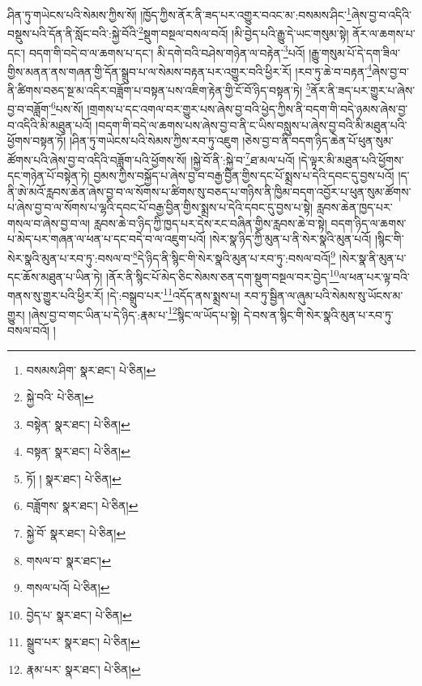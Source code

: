 ཤིན་ཏུ་གཡེངས་པའི་སེམས་ཀྱིས་སོ། །ཁྱོད་ཀྱིས་ནོར་ནི་ཟད་པར་འགྱུར་བའང་མ་:བསམས་ཤིང་\footnote{བསམས་ཤིག་  སྣར་ཐང་།  པེ་ཅིན། }ཞེས་བྱ་བ་འདིའི་བསྡུས་པའི་དོན་ནི་སློང་བའི་:སྐྱེ་བོའི་\footnote{སྐྱེ་བའི་  པེ་ཅིན། }སྡུག་བསྔལ་བསལ་བའོ། །མི་བྱེད་པའི་རྒྱུ་དེ་ཡང་གསུམ་སྟེ། ནོར་ལ་ཆགས་པ་དང་། བདག་གི་བདེ་བ་ལ་ཆགས་པ་དང་། མི་དགེ་བའི་བཤེས་གཉེན་ལ་བརྟེན་\footnote{བསྟེན་  སྣར་ཐང་།  པེ་ཅིན། }པའོ། །རྒྱུ་གསུམ་པོ་དེ་དག་ཟིལ་གྱིས་མནན་ནས་གཞན་གྱི་དོན་སྒྲུབ་པ་ལ་སེམས་བརྟན་པར་འགྱུར་བའི་ཕྱིར་རོ། །རབ་ཏུ་ཆེ་བ་བརྟན་\footnote{བསྟན་  སྣར་ཐང་།  པེ་ཅིན། }ཞེས་བྱ་བ་ནི་ཚིགས་བཅད་སྔ་མ་འདིར་བཟློག་པ་བསྟན་པས་འཇིག་རྟེན་གྱི་ངོ་བོ་ཉིད་བསྟན་ཏེ། \footnote{ཏོ། །   སྣར་ཐང་།  པེ་ཅིན། }ནོར་ནི་ཟད་པར་གྱུར་པ་ཞེས་བྱ་བ་བཟློག་\footnote{བཟློགས་  སྣར་ཐང་།  པེ་ཅིན། }པས་སོ། །གྲགས་པ་དང་འགལ་བར་གྱུར་པས་ཞེས་བྱ་བའི་ཕྱེད་ཀྱིས་ནི་བདག་གི་བདེ་ཉམས་ཞེས་བྱ་བ་འདིའི་མི་མཐུན་པའོ། །བདག་གི་བདེ་ལ་ཆགས་པས་ཞེས་བྱ་བ་ནི་ང་ཡིས་བསླུས་པ་ཞེས་བྱ་བའི་མི་མཐུན་པའི་ཕྱོགས་བསྟན་ཏོ། །ཤིན་ཏུ་གཡེངས་པའི་སེམས་ཀྱིས་རབ་ཏུ་འཇུག །ཅེས་བྱ་བ་ནི་བདག་ཉིད་ཆེན་པོ་ཕུན་སུམ་ཚོགས་པའི་ཞེས་བྱ་བ་འདིའི་བཟློག་པའི་ཕྱོགས་སོ། །སྐྱེ་བོ་ནི་:སྐྱེ་བ་\footnote{སྐྱེ་བོ་  སྣར་ཐང་།  པེ་ཅིན། }ཐ་མལ་པའོ། །དེ་ལྟར་མི་མཐུན་པའི་ཕྱོགས་དང་གཉེན་པོ་བསྟེན་ཏེ། བྱམས་ཀྱིས་བསྐྱོད་པ་ཞེས་བྱ་བ་བརྒྱ་བྱིན་གྱིས་དང་པོ་སྨྲས་པ་དེའི་དབང་དུ་བྱས་པའོ། །ད་ནི་ཨེ་མའོ་རླབས་ཆེན་ཞེས་བྱ་བ་ལ་སོགས་པ་ཚིགས་སུ་བཅད་པ་གཉིས་ནི་ཁྱིམ་བདག་འབྱོར་པ་ཕུན་སུམ་ཚོགས་པ་ཞེས་བྱ་བ་ལ་སོགས་པ་ལྷའི་དབང་པོ་བརྒྱ་བྱིན་གྱིས་སྨྲས་པ་དེའི་དབང་དུ་བྱས་པ་སྟེ། རླབས་ཆེན་ཁྱད་པར་གསལ་བ་ཞེས་བྱ་བ་ལ། རླབས་ཆེ་བ་ཉིད་ཀྱི་ཁྱད་པར་དེས་རང་བཞིན་གྱིས་རླབས་ཆེ་བ་སྟེ། བདག་ཉིད་ལ་ཆགས་པ་མེད་པར་གཞན་ལ་ཕན་པ་དང་བདེ་བ་ལ་འཇུག་པའོ། །སེར་སྣ་ཉིད་ཀྱི་མུན་པ་ནི་སེར་སྣའི་མུན་པའོ། །སྙིང་གི་སེར་སྣའི་མུན་པ་རབ་ཏུ་:བསལ་བ་\footnote{གསལ་བ་  སྣར་ཐང་། }དེ་ཉིད་ནི་སྙིང་གི་སེར་སྣའི་མུན་པ་རབ་ཏུ་:བསལ་བའོ།\footnote{གསལ་པའོ།  པེ་ཅིན། } །སེར་སྣ་ནི་མུན་པ་དང་ཆོས་མཐུན་པ་ཡིན་ཏེ། །ནོར་ནི་སྙིང་པོ་མེད་ཅིང་སེམས་ཅན་དག་སྡུག་བསྔལ་བར་བྱེད་\footnote{བྱེད་པ་  སྣར་ཐང་།  པེ་ཅིན། }ལ་ཕན་པར་ལྟ་བའི་གནས་སུ་གྱུར་པའི་ཕྱིར་རོ། །དེ་:བསྒྲུབ་པར་\footnote{སྒྲུབ་པར་  སྣར་ཐང་།  པེ་ཅིན། }འདོད་ནས་སྨྲས་པ། རབ་ཏུ་སྦྱིན་ལ་ཞུམ་པའི་སེམས་སུ་ཡོངས་མ་གྱུར། །ཞེས་བྱ་བ་གང་ཡིན་པ་དེ་ཉིད་:རྣམ་པ་\footnote{རྣམ་པར་  སྣར་ཐང་།  པེ་ཅིན། }སྙིང་ལ་ཡོད་པ་སྟེ། དེ་བས་ན་སྙིང་གི་སེར་སྣའི་མུན་པ་རབ་ཏུ་བསལ་བའོ། །
